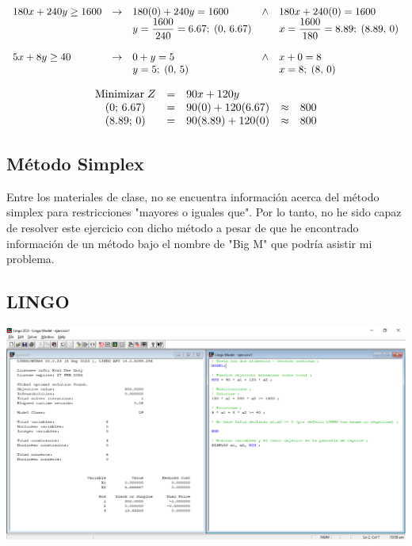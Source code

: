 \documentclass[12pt]{article}
\begin{document}
\[
\begin{array}{l l l l l l l}
180x + 240y \geq 1600 & \rightarrow & 180(0) + 240y = 1600  & \wedge & 180x + 240(0) = 1600 \\
                   &             & y = \dfrac{1600}{240} = 6.67;\; (0,\,6.67) &        & x = \dfrac{1600}{180} = 8.89;\; (8.89,\,0)  \\
                   &             &                    &        &                   \\
5x + 8y \geq 40     & \rightarrow & 0 + y = 5         & \wedge & x + 0 = 8         \\
                   &             & y = 5;\; (0,\,5)   &        & x = 8;\; (8,\,0)  \\
\end{array}
\]

\vspace{0.25cm}

\[
\begin{array}{c c l c l}
\text{Minimizar}\;Z & = & 90x + 120y     &   &      \\
(0;\, 6.67)            & = & 90(0) + 120(6.67) & \approx & 800 \\
(8.89;\, 0)            & = & 90(8.89) + 120(0) & \approx & 800 \\
\end{array}
\]



\newpage
\subsection*{Método Simplex}
\noindent Entre los materiales de clase, no se encuentra información acerca del método simplex para restricciones "mayores o iguales que". Por lo tanto, no he sido capaz de resolver este ejercicio con dicho método a pesar de que he encontrado información de un método bajo el nombre de "Big M" que podría asistir mi problema.



\subsection*{LINGO}
\begin{center}
  \includegraphics[width=1\textwidth]{./assets/ejercicio1.PNG}
\end{center}
\end{document}
